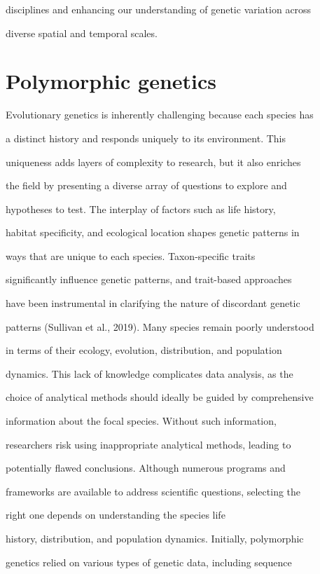 \documentclass[10pt,twoside]{article}
\numberwithin{equation}{section}
\begin{document}
disciplines and enhancing our understanding of genetic variation across

diverse spatial and temporal scales.



\section{Polymorphic genetics}



Evolutionary genetics is inherently challenging because each species has

a distinct history and responds uniquely to its environment. This

uniqueness adds layers of complexity to research, but it also enriches

the field by presenting a diverse array of questions to explore and

hypotheses to test. The interplay of factors such as life history,

habitat specificity, and ecological location shapes genetic patterns in

ways that are unique to each species. Taxon-specific traits

significantly influence genetic patterns, and trait-based approaches

have been instrumental in clarifying the nature of discordant genetic

patterns (Sullivan et al., 2019). Many species remain poorly understood

in terms of their ecology, evolution, distribution, and population

dynamics. This lack of knowledge complicates data analysis, as the

choice of analytical methods should ideally be guided by comprehensive

information about the focal species. Without such information,

researchers risk using inappropriate analytical methods, leading to

potentially flawed conclusions. Although numerous programs and

frameworks are available to address scientific questions, selecting the

right one depends on understanding the species\textquotesingle{} life

history, distribution, and population dynamics. Initially, polymorphic

genetics relied on various types of genetic data, including sequence
\end{document}
